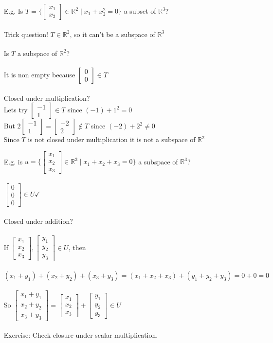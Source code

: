 \documentclass{letter}
\newcommand{\0}[1]{\begin{bmatrix}#1\end{bmatrix}}
\begin{document}
\begin{itemize}
		\item[E.g.] Is $T = \{  \0{x_1\\x_2}\in \mathbb{R}^2 \mid x_1 + x_2^2 = 0 \}$ a subset of $\mathbb{R}^3$?\\\\
		Trick question! $T \in \mathbb{R}^2$, so it can't be a subspace of $\mathbb{R}^3$\\\\
		Is $T$ a subspace of $\mathbb{R}^2$?\\\\
		It is non empty because $\0{0\\0} \in T$\\\\
		Closed under multiplication?\\
		Lets try $\0{-1\\1} \in T$ since $(-1) + 1^2 = 0$\\
		But $2\0{-1\\1} = \0{-2\\2} \notin T$ since $(-2) + 2^2 \neq 0$\\
		Since $T$ is not closed under multiplication it is not a subspace of $\mathbb{R}^2$
		\clearpage
		\item[E.g.] is $u = \{\0{x_1\\x_2\\x_3} \in \mathbb{R}^3 \mid x_1 + x_2 + x_3 = 0\}$ a subspace of $\mathbb{R}^3$?\\\\
		$\0{0\\0\\0} \in U \checkmark$\\\\
		Closed under addition?\\\\
		If $\0{x_1\\x_2\\x_3}, \0{y_1\\y_2\\y_3} \in U$, then\\\\
		$(x_1 + y_1) + (x_2 + y_2) + (x_3 + y_3) = (x_1 + x_2 + x_3) + (y_1 + y_2 + y_3) = 0 + 0 = 0$\\\\
		So $\0{x_1 + y_1\\x_2+y_2\\x_3+y_3} = \0{x_1\\x_2\\x_3} + \0{y_1\\y_2\\y_3} \in U$\\\\
		Exercise: Check closure under scalar multiplication.
	\end{itemize}
	
\end{document}

